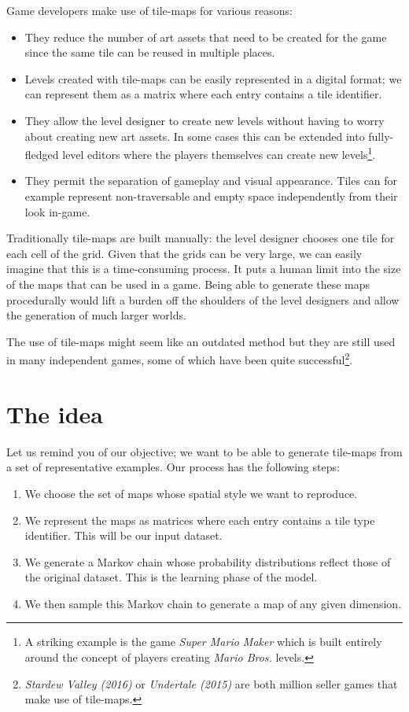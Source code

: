 \documentclass[A4paper,]{article}
\providecommand{\tightlist}{%
  \setlength{\itemsep}{0pt}\setlength{\parskip}{0pt}}
\begin{document}
Game developers make use of tile-maps for various reasons:

\begin{itemize}
\tightlist
\item
  They reduce the number of art assets that need to be created for the
  game since the same tile can be reused in multiple places.
\item
  Levels created with tile-maps can be easily represented in a digital
  format; we can represent them as a matrix where each entry contains a
  tile identifier.
\item
  They allow the level designer to create new levels without having to
  worry about creating new art assets. In some cases this can be
  extended into fully-fledged level editors where the players themselves
  can create new levels\footnote{A striking example is the game
    \emph{Super Mario Maker} which is built entirely around the concept
    of players creating \emph{Mario Bros.} levels.}.
\item
  They permit the separation of gameplay and visual appearance. Tiles
  can for example represent non-traversable and empty space
  independently from their look in-game.
\end{itemize}

Traditionally tile-maps are built manually: the level designer chooses
one tile for each cell of the grid. Given that the grids can be very
large, we can easily imagine that this is a time-consuming process. It
puts a human limit into the size of the maps that can be used in a game.
Being able to generate these maps procedurally would lift a burden off
the shoulders of the level designers and allow the generation of much
larger worlds.

The use of tile-maps might seem like an outdated method but they are
still used in many independent games, some of which have been quite
successful\footnote{\emph{Stardew Valley (2016)} or \emph{Undertale
  (2015)} are both million seller games that make use of tile-maps.}.

\section{The idea}\label{sec:idea}

Let us remind you of our objective; we want to be able to generate
tile-maps from a set of representative examples. Our process has the
following steps:

\begin{enumerate}
\def\labelenumi{\arabic{enumi}.}
\tightlist
\item
  We choose the set of maps whose spatial style we want to reproduce.
\item
  We represent the maps as matrices where each entry contains a tile
  type identifier. This will be our input dataset.
\item
  We generate a Markov chain whose probability distributions reflect
  those of the original dataset. This is the learning phase of the
  model.
\item
  We then sample this Markov chain to generate a map of any given
  dimension.
\end{enumerate}
\end{document}
